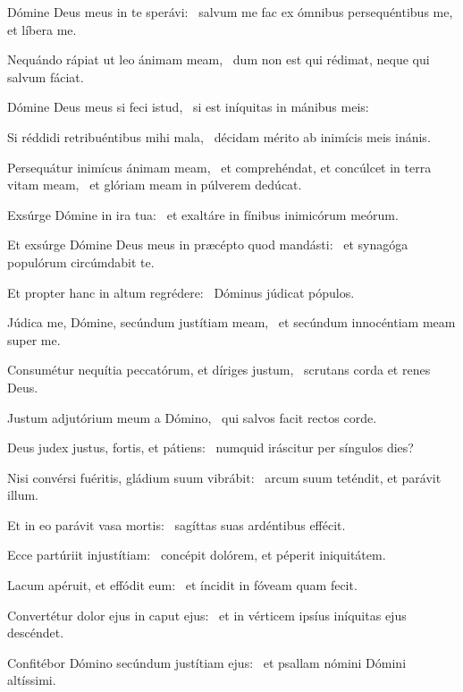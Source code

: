 \item Dómine Deus meus in te sperávi:~\psstar{} salvum me fac ex ómnibus persequéntibus me, et líbera me.

\item Nequándo rápiat ut leo ánimam meam,~\psstar{} dum non est qui rédimat, neque qui salvum fáciat.

\item Dómine Deus meus si feci istud,~\psstar{} si est iníquitas in mánibus meis:

\item Si réddidi retribuéntibus mihi mala,~\psstar{} décidam mérito ab inimícis meis inánis.

\item Persequátur inimícus ánimam meam,~\pscross{} et comprehéndat, et concúlcet in terra vitam meam,~\psstar{} et glóriam meam in púlverem dedúcat.

\item Exsúrge Dómine in ira tua:~\psstar{} et exaltáre in fínibus inimicórum meórum.

\item Et exsúrge Dómine Deus meus in præcépto quod mandásti:~\psstar{} et synagóga populórum circúmdabit te.

\item Et propter hanc in altum regrédere:~\psstar{} Dóminus júdicat pópulos.

\item Júdica me, Dómine, secúndum justítiam meam,~\psstar{} et secúndum innocéntiam meam super me.

\item Consumétur nequítia peccatórum, et díriges justum,~\psstar{} scrutans corda et renes Deus.

\item Justum adjutórium meum a Dómino,~\psstar{} qui salvos facit rectos corde.

\item Deus judex justus, fortis, et pátiens:~\psstar{} numquid iráscitur per síngulos dies?

\item Nisi convérsi fuéritis, gládium suum vibrábit:~\psstar{} arcum suum teténdit, et parávit illum.

\item Et in eo parávit vasa mortis:~\psstar{} sagíttas suas ardéntibus effécit.

\item Ecce partúriit injustítiam:~\psstar{} concépit dolórem, et péperit iniquitátem.

\item Lacum apéruit, et effódit eum:~\psstar{} et íncidit in fóveam quam fecit.

\item Convertétur dolor ejus in caput ejus:~\psstar{} et in vérticem ipsíus iníquitas ejus descéndet.

\item Confitébor Dómino secúndum justítiam ejus:~\psstar{} et psallam nómini Dómini altíssimi.